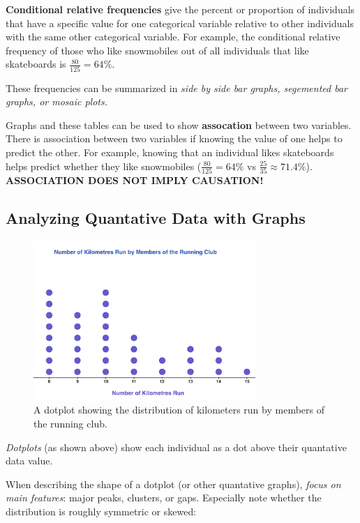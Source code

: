 \documentclass[12pt, a4paper]{article}
\theoremstyle{definition}
\begin{document}
\textbf{Conditional relative frequencies} give the percent or proportion of individuals that have a specific value for one categorical variable relative to other individuals with the same other categorical variable. For example, the conditional relative frequency of those who like snowmobiles out of all individuals that like skateboards is $\frac{80}{125} = 64\%$.

These frequencies can be summarized in \emph{side by side bar graphs, segemented bar graphs, or mosaic plots.}

Graphs and these tables can be used to show \textbf{assocation} between two variables. There is association between two variables if knowing the value of one helps to predict the other. For example, knowing that an individual likes skateboards helps predict whether they like snowmobiles ($\frac{80}{125} = 64\%$ vs $\frac{25}{35} \approx 71.4\%$). \textbf{ASSOCIATION DOES NOT IMPLY CAUSATION!}

\newpage

\subsection{Analyzing Quantative Data with Graphs}
\begin{figure}[t]
    \centering
    \includegraphics[width=0.75\textwidth]{dotplot.png}
    \caption{A dotplot showing the distribution of kilometers run by members of the running club.}
    \label{fig:dotplot}
\end{figure}

\emph{Dotplots} (as shown above) show each individual as a dot above their quantative data value.

When describing the shape of a dotplot (or other quantative graphs), \emph{focus on main features}: major peaks, clusters, or gaps. Especially note whether the distribution is roughly symmetric or skewed:
\end{document}
